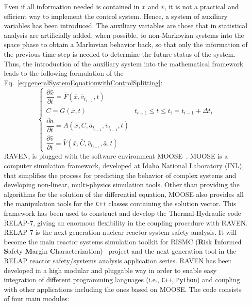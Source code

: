 \documentclass{mc2013}
\begin{document}
Even if all information needed is contained in $\bar{x}$ and $\bar{v}$, it is not a practical and efficient way to implement the control system. Hence, a system of auxiliary variables has been introduced.
The auxiliary variables are those that in statistical analysis are artificially added, when possible, to non-Markovian systems into the space phase to obtain a Markovian behavior back, so that only the information of the previous time step is needed to determine the future status of the system.
Thus, the introduction of the auxiliary system into the mathematical framework leads to the following formulation of the Eq.~\ref{eq:generalSystemEquationwithControlSplitting}:
\vspace{-2mm}
\begin{equation}
\begin{cases} 
\dfrac{\partial \bar{x}}{\partial t} = \bar{F}(\bar{x},\bar{v}_{t_{i-1}},t) \\
\bar{C} = \bar{G}(\bar{x},t) & t_{i-1}\leq t\leq t_{i} = t_{i-1} + \Delta t_{i}\\ 
\dfrac{\partial \bar{a}}{\partial t} = \bar{A}(\bar{x},\bar{C},\bar{a}_{t_{i-1}},\bar{v}_{t_{i-1}},t) \\
\dfrac{\partial \bar{v}}{\partial t} = \bar{V}(\bar{x},\bar{C},\bar{v}_{t_{i-1}},\bar{a},t) 
\end{cases}
\label{eq:generalSystemEquationwithControlSplittingAndAux}
\end{equation}
RAVEN, is plugged with the software environment MOOSE~\cite{MOOSE}. MOOSE is a computer simulation framework,  developed at Idaho National Laboratory (INL), that simplifies the process for predicting the behavior of complex systems and developing non-linear, multi-physics simulation tools. Other than providing the algorithms for the solution of the differential equation, MOOSE also provides all the manipulation tools for the \verb!C++! classes containing the solution vector. This framework has been used to construct and develop the Thermal-Hydraulic code RELAP-7, giving an enormous flexibility in the coupling procedure with RAVEN. 
RELAP-7 is the next generation nuclear reactor system safety analysis. It will become the main reactor systems simulation toolkit for RISMC (\textbf{R}isk \textbf{I}nformed \textbf{S}afety \textbf{M}argin \textbf{C}haracterization)~\cite{mandelliANS_RISMC} project and the next generation tool in the RELAP reactor safety/systems analysis application series. 
RAVEN has been developed in a high modular and pluggable way in order to enable easy integration of different programming languages (i.e., \verb!C++!, \verb!Python!) and coupling with other applications including the ones based on MOOSE. The code consists of four main modules:
\end{document}
